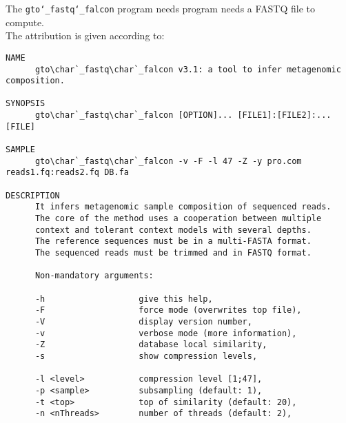 The \texttt{gto\char`_fastq\char`_falcon} program needs program needs a FASTQ file to compute.\\
The attribution is given according to:
\begin{lstlisting}
NAME                                                                     
      gto\char`_fastq\char`_falcon v3.1: a tool to infer metagenomic composition.            
                                                                         
SYNOPSIS                                                                 
      gto\char`_fastq\char`_falcon [OPTION]... [FILE1]:[FILE2]:... [FILE]                      
                                                                         
SAMPLE                                                                   
      gto\char`_fastq\char`_falcon -v -F -l 47 -Z -y pro.com reads1.fq:reads2.fq DB.fa         
                                                                         
DESCRIPTION                                                              
      It infers metagenomic sample composition of sequenced reads.       
      The core of the method uses a cooperation between multiple         
      context and tolerant context models with several depths.           
      The reference sequences must be in a multi-FASTA format.           
      The sequenced reads must be trimmed and in FASTQ format.           
                                                                         
      Non-mandatory arguments:                                           
                                                                         
      -h                   give this help,                               
      -F                   force mode (overwrites top file),             
      -V                   display version number,                       
      -v                   verbose mode (more information),              
      -Z                   database local similarity,                    
      -s                   show compression levels,                      
                                                                         
      -l <level>           compression level [1;47],                    
      -p <sample>          subsampling (default: 1),                    
      -t <top>             top of similarity (default: 20),              
      -n <nThreads>        number of threads (default: 2),              
                                                                         

\end{lstlisting}
